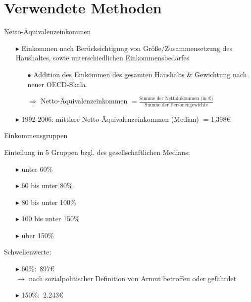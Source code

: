 \documentclass{beamer}
\begin{document}
\section{Verwendete Methoden}
\begin{frame}{Netto-Äquivalenzeinkommen}
	\begin{itemize}
		\item[$\blacktriangleright$] Einkommen nach Berücksichtigung von Größe/Zusammensetzung des Haushaltes, sowie unterschiedlichen Einkommensbedarfes
\vspace{0.3cm}		
		\begin{itemize}
		\item[$\bullet$]	Addition des Einkommen des gesamten Haushalts \& Gewichtung nach neuer OECD-Skala
\vspace{0.2cm}
		\item[$\Rightarrow$] Netto-Äquivalenzeinkommen $=\frac{\text{Summe der Nettoinkommen (in €)}}{\text{Summe der Personengewichte}}$
		\end{itemize}
\vspace{0.3cm}
		\item[$\blacktriangleright$] 1992-2006: mittlere Netto-Äquivalenzeinkommen (Median) $=$1.398€
	\end{itemize}
\end{frame}

\begin{frame}{Einkommensgruppen}
	\begin{block}{Einteilung in 5 Gruppen bzgl. des gesellschaftlichen Medians:}
		\begin{itemize}
			\item[$\blacktriangleright$] unter 60\%
			\item[$\blacktriangleright$] 60 bis unter 80\%
			\item[$\blacktriangleright$] 80 bis unter 100\%
			\item[$\blacktriangleright$] 100 bis unter 150\%
			\item[$\blacktriangleright$] über 150\%
		\end{itemize}
	\end{block}
	\begin{block}{Schwellenwerte:}
		\begin{itemize}
			\item[$\blacktriangleright$] 60\%:\, 897€ \\ $\rightarrow$ nach sozialpolitischer Definition von Armut betroffen oder gefährdet
			\item[$\blacktriangleright$] 150\%:\, 2.243€
		\end{itemize}
	\end{block}
\end{frame}
\end{document}

